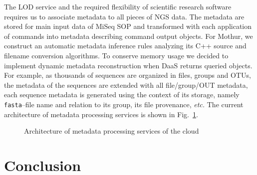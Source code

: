 \documentclass[a4paper]{jpconf}
\begin{document}
The LOD service and the required flexibility of scientific research software requires us to associate metadata to all pieces of NGS data.  The metadata are stored for main input data of MiSeq SOP and transformed with each application of commands into metadata describing command output objects.  For Mothur, we construct an automatic metadata inference rules analyzing its C++ source and filename conversion algorithms.  To conserve memory usage we decided to implement dynamic metadata reconstruction when DaaS returns queried objects.  For example, as thousands of sequences are organized in files, groups and OTUs, the metadata of the sequences are extended with all file/group/OUT metadata, each sequence metadata is generated using the context of its storage, namely \verb|fasta|--file name and relation to its group, its file provenance, \emph{etc.}  The current architecture of metadata processing services is shown in Fig.~\ref{fig:metadata}.












\begin{figure}[bt]
  \centering
  \caption{Architecture of metadata processing services of the cloud}
  \label{fig:metadata}
\end{figure}

\section*{Conclusion}
\end{document}
